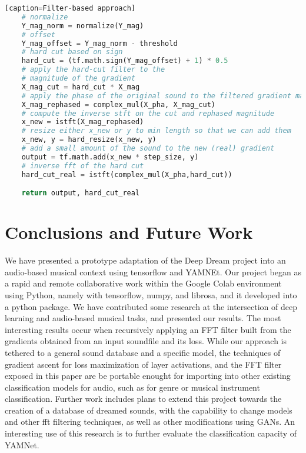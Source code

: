 \documentclass[a4paper,10pt,oneside]{article}
\begin{document}
\begin{sloppy}
\begin{lstlisting}[language=Python][caption=Filter-based approach]
    # normalize
    Y_mag_norm = normalize(Y_mag)
    # offset
    Y_mag_offset = Y_mag_norm - threshold
    # hard cut based on sign
    hard_cut = (tf.math.sign(Y_mag_offset) + 1) * 0.5
    # apply the hard-cut filter to the 
    # magnitude of the gradient
    X_mag_cut = hard_cut * X_mag
    # apply the phase of the original sound to the filtered gradient mag
    X_mag_rephased = complex_mul(X_pha, X_mag_cut)
    # compute the inverse stft on the cut and rephased magnitude
    x_new = istft(X_mag_rephased)
    # resize either x_new or y to min length so that we can add them
    x_new, y = hard_resize(x_new, y)
    # add a small amount of the sound to the new (real) gradient 
    output = tf.math.add(x_new * step_size, y)
    # inverse fft of the hard cut
    hard_cut_real = istft(complex_mul(X_pha,hard_cut))

    return output, hard_cut_real
\end{lstlisting}


\section{Conclusions and Future Work}

 
We have presented a prototype adaptation of the Deep Dream project into an audio-based musical context using tensorflow and YAMNEt. Our project began as a rapid and remote collaborative work within the Google Colab environment using Python, namely with tensorflow, numpy, and librosa, and it developed into a python package. We have contributed some research at the intersection of deep learning and audio-based musical tasks, and presented our results. The most interesting results occur when recursively applying an FFT filter built from the gradients obtained from an input soundfile and its loss. While our approach is tethered to a general sound database and a specific model, the techniques of gradient ascent for loss maximization of layer activations, and the FFT filter exposed in this paper are be portable enought for importing into other existing classification models for audio, such as for genre or musical instrument classification. Further work includes plans to extend this project towards the creation of a database of dreamed sounds, with the capability to change models and other fft filtering techniques, as well as other modifications using GANs. An interesting use of this research is to further evaluate the classification capacity of YAMNet.




\end{sloppy}
\end{document}
